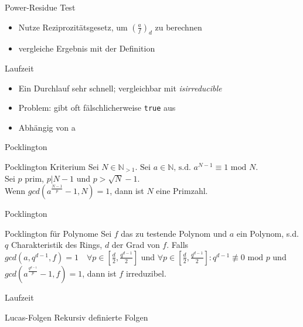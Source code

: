 \documentclass[german,10pt,xcolor=colortbl,compress]{beamer}%
\newcommand{\NN}{\mathbb{N}}
\begin{document}
	
	\begin{frame}{Power-Residue Test}
		\begin{itemize}
		\item Nutze Reziprozitätsgesetz, um $(\frac{a}{f})_d $ zu berechnen
		\item vergleiche Ergebnis mit der Definition
		\end{itemize}
	\end{frame}

	
	\begin{frame}{Laufzeit}
		\begin{itemize}
			\item Ein Durchlauf sehr schnell; vergleichbar mit \textit{isirreducible}
			\item Problem: gibt oft fälschlicherweise \texttt{true} aus
			\item Abhängig von a
		\end{itemize}
	\end{frame}

	
	\begin{frame}{Pocklington}
		\begin{block}{Pocklington Kriterium}
			Sei $N\in \NN_{>1}$. $%
			\text{Sei } a \in \NN \text{, s.d. } a^{N-1} \equiv 1 \text{ mod } N$.\\
			Sei $p$ prim, $p | N-1$ und $p> \sqrt{N}-1$.\\
			Wenn $gcd(a^{\frac{N-1}{p}}-1,N) = 1$, dann ist $N$ eine Primzahl.
		\end{block}
	\end{frame}

		
	\begin{frame}{Pocklington}
		\begin{block}{Pocklington für Polynome}
			Sei $f$ das zu testende Polynom und $a$ ein Polynom, s.d. 
			$q$ Charakteristik des Rings, $d$ der Grad von $f$.
			Falls $gcd(a,q^{d-1},f)=1 \quad \forall p \in [\frac{d}{2}, \frac{q^{d-1}}{2}]$ und 
			$\forall p \in [\frac{d}{2}, \frac{q^{d-1}}{2}]: q^{d-1} \not\equiv 0 \text{ mod } p$ und $gcd(a^{\frac{q^{d-1}}{p}}-1, f)=1$, dann ist $f$ irreduzibel. 
			
			
		\end{block}
	\end{frame}


	\begin{frame}{Laufzeit}
		
	\end{frame}


	\begin{frame}{Lucas-Folgen}
		Rekursiv definierte Folgen 
	\end{frame}
	
\end{document}
